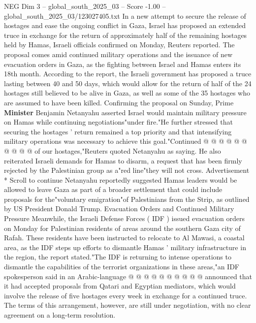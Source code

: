 \begin{textsample}{NEG Dim 3 – global\_south\_2025\_03 – Score -1.00 – global\_south\_2025\_03/123027405.txt}  \label{ex:f3_neg_421}
In a new attempt to secure the release of hostages and ease the ongoing conflict in Gaza, Israel has proposed an extended truce in exchange for the return of approximately half of the remaining hostages held by Hamas, Israeli officials confirmed on Monday, Reuters reported.
The proposal comes amid continued military operations and the issuance of new evacuation orders in Gaza, as the fighting between Israel and Hamas enters its 18th month.
According to the report, the Israeli government has proposed a truce lasting between 40 and 50 days, which would allow for the return of half of the 24 hostages still believed to be alive in Gaza, as well as some of the 35 hostages who are assumed to have been killed.
Confirming the proposal on Sunday, Prime \textbf{Minister} Benjamin Netanyahu asserted Israel would maintain military pressure on Hamas while continuing negotiations"under fire."He further stressed that securing the hostages ' return remained a top priority and that intensifying military operations was necessary to achieve this goal."Continued @ @ @ @ @ @ @ @ @ @ of our hostages,"Reuters quoted Netanyahu as saying.
He also reiterated Israeli demands for Hamas to disarm, a request that has been firmly rejected by the Palestinian group as a"red line"they will not cross.
Advertisement * Scroll to continue Netanyahu reportedly suggested Hamas leaders would be allowed to leave Gaza as part of a broader settlement that could include proposals for the"voluntary emigration"of Palestinians from the Strip, as outlined by US President Donald Trump.
Evacuation Orders and Continued Military Pressure Meanwhile, the Israeli Defense Forces ( IDF ) issued evacuation orders on Monday for Palestinian residents of areas around the southern Gaza city of Rafah.
These residents have been instructed to relocate to Al Mawasi, a coastal area, as the IDF steps up efforts to dismantle Hamas ' military infrastructure in the region, the report stated."The IDF is returning to intense operations to dismantle the capabilities of the terrorist organizations in these areas,"an IDF spokesperson said in an Arabic-language @ @ @ @ @ @ @ @ @ @ announced that it had accepted proposals from Qatari and Egyptian mediators, which would involve the release of five hostages every week in exchange for a continued truce.
The terms of this arrangement, however, are still under negotiation, with no clear agreement on a long-term resolution.

\end{textsample}
